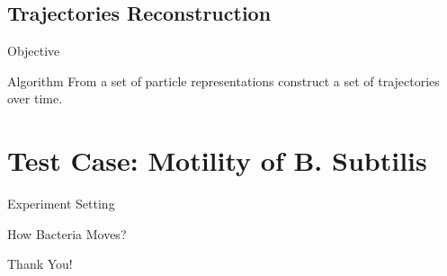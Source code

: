 \documentclass{beamer}
\begin{document}
	\subsection{Trajectories Reconstruction}	
		\begin{frame}{Objective}
			\begin{block}{Algorithm}
				From a set of particle representations construct a set of trajectories over time.
			\end{block}
			
		\end{frame}
	


\section{Test Case: Motility of B. Subtilis}
	\begin{frame}{Experiment Setting}

	\end{frame}
	\begin{frame}{How Bacteria Moves?}

	\end{frame}




\begin{frame}%
\begin{center}
{\fontsize{40}{50}\selectfont Thank You!}
\end{center}
\end{frame}
\end{document}
